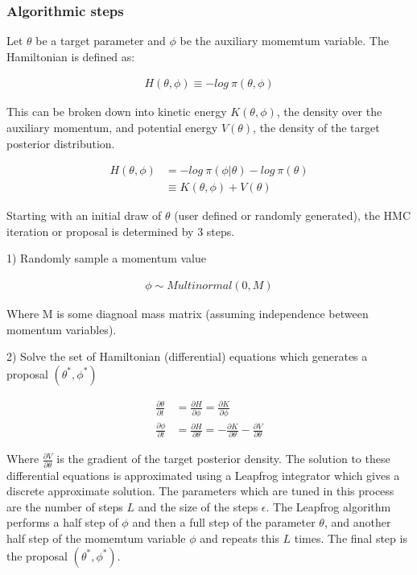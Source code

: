\documentclass[12pt, a4paper]{article}
\begin{document}
        \subsubsection{Algorithmic steps}
        Let $\theta$ be a target parameter and $\phi$ be the auxiliary momemtum variable. The Hamiltonian is defined as:

        $$
        \begin{aligned}
        H(\theta, \phi) \equiv - log \: \pi(\theta, \phi)
        \end{aligned}
        $$

        This can be broken down into kinetic energy $K(\theta, \phi)$, the density over the auxiliary momentum, and potential energy $V(\theta)$, the density of the target posterior distribution.

        $$
        \begin{aligned}
        H(\theta, \phi) &= - log \: \pi(\phi | \theta) - log \: \pi(\theta) \\ 
        &\equiv  K(\theta, \phi) + V(\theta)
        \end{aligned}
        $$

         Starting with an initial draw of $\theta$ (user defined or randomly generated), the HMC iteration or proposal is determined by 3 steps.

        1) Randomly sample a momentum value

        $$
        \begin{aligned}
        \phi\sim Multinormal(0, M)
        \end{aligned}
        $$

        Where M is some diagnoal mass matrix (assuming independence between momentum variables).

        2) Solve the set of Hamiltonian (differential) equations which generates a proposal $(\theta^{\ast}, \phi^{\ast})$

        $$
        \begin{aligned}
        \frac{\partial \theta}{\partial t} &= \frac{\partial H}{\partial \phi} = \frac{\partial K}{\partial \phi} \\
        \frac{\partial \phi}{\partial t} &= \frac{\partial H}{\partial \theta} = - \frac{\partial K}{\partial \theta} - \frac{\partial V}        {\partial \theta}
        \end{aligned}
        $$

        Where $\frac{\partial V}{\partial \theta}$ is the gradient of the target posterior density. The solution to these differential equations is approximated using a Leapfrog integrator which gives a discrete approximate solution. The parameters which are tuned in this process are the number of steps $L$ and the size of the steps $\epsilon$. The Leapfrog algorithm performs a half step of $\phi$ and then a full step of the parameter $\theta$, and another half step of the momemtum variable $\phi$ and repeats this $L$ times. The final step is the proposal $(\theta^{\ast}, \phi^{\ast})$.
\end{document}
